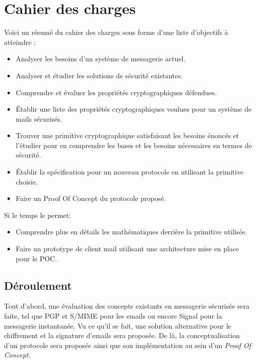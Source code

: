 \section*{Cahier des charges}
Voici un résumé du cahier des charges sous forme d'une liste d'objectifs à atteindre :
\begin{itemize}
	\item Analyser les besoins d’un système de messagerie actuel.
	\item Analyser et étudier les solutions de sécurité existantes.
	\item Comprendre et évaluer les propriétés cryptographiques défendues.
	\item Établir une liste des propriétés cryptographiques voulues pour un système de mails sécurisés.
	\item Trouver une primitive cryptographique satisfaisant les besoins énoncés et l’étudier pour en comprendre les bases et les besoins nécessaires en termes de sécurité.
	\item Établir la spécification pour un nouveau protocole en utilisant la primitive choisie.
	\item Faire un Proof Of Concept du protocole proposé.
\end{itemize}
Si le temps le permet: 
\begin{itemize}
	\item Comprendre plus en détails les mathématiques derrière la primitive utilisée.
	\item Faire un prototype de client mail utilisant une architecture mise en place pour le POC.
\end{itemize}


\subsection*{Déroulement}
Tout d'abord, une évaluation des concepts existants en messagerie sécurisée sera faite, tel que PGP et S/MIME pour les emails ou encore Signal pour la messagerie instantanée. Vu ce qu'il se fait, une solution alternative pour le chiffrement et la signature d'emails sera proposée. De là, la conceptualisation d'un protocole sera proposée ainsi que son implémentation au sein d'un \textit{Proof Of Concept}.
